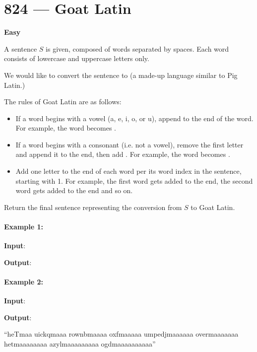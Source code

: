 \section{824 --- Goat Latin}

\textbf{Easy}

A sentence $S$ is given, composed of words separated by spaces. Each word consists of lowercase and uppercase letters only.

We would like to convert the sentence to  (a made-up language similar to Pig Latin.)

The rules of Goat Latin are as follows:

\begin{itemize}
\item If a word begins with a vowel (a, e, i, o, or u), append  to the end of the word. For example, the word  becomes .
     
\item If a word begins with a consonant (i.e. not a vowel), remove the first letter and append it to the end, then add . For example, the word  becomes .
     
\item Add one letter  to the end of each word per its word index in the sentence, starting with 1. For example, the first word gets  added to the end, the second word gets  added to the end and so on.
\end{itemize}

Return the final sentence representing the conversion from $S$ to Goat Latin. 

 

\paragraph{Example 1:}

\begin{flushleft}
\textbf{Input}: 

\textbf{Output}: 
\end{flushleft}

\paragraph{Example 2:}

\begin{flushleft}
\textbf{Input}: 

\textbf{Output}: 

``heTmaa uickqmaaa rownbmaaaa oxfmaaaaa umpedjmaaaaaa overmaaaaaaa hetmaaaaaaaa azylmaaaaaaaaa ogdmaaaaaaaaaa''

\end{flushleft}
 

